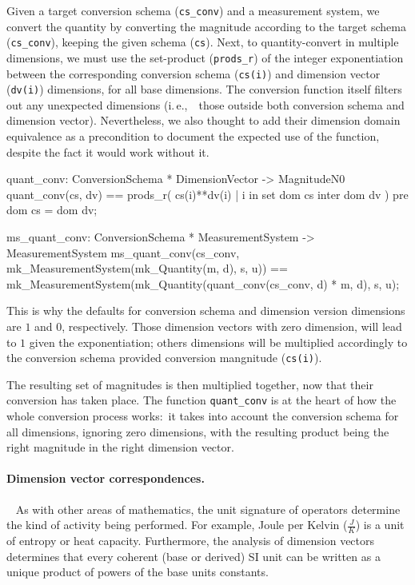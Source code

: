 \documentclass[runningheads,a4paper]{llncs}
\newcommand{\ie}{i.\,e.,\ }
\begin{document}
Given a target conversion schema (\texttt{cs\_conv}) and a measurement system, we convert the quantity by converting the magnitude according to the target schema (\texttt{cs\_conv}), keeping the given schema (\texttt{cs}). Next, to quantity-convert in multiple dimensions, we must use the set-product (\texttt{prods\_r}) of the integer exponentiation between the corresponding conversion schema (\texttt{cs(i)}) and dimension vector (\texttt{dv(i)}) dimensions, for all base dimensions. The conversion function itself filters out any unexpected dimensions (\ie~those outside both conversion schema and dimension vector). Nevertheless, we also thought to add their dimension domain equivalence as a precondition to document the expected use of the function, despite the fact it would work without it.  
%
\begin{vdmsl}[frame=none,basicstyle=\ttfamily\scriptsize]
    quant_conv: ConversionSchema * DimensionVector -> MagnitudeN0
    quant_conv(cs, dv) ==
        prods_r({ cs(i)**dv(i) | i in set dom cs inter dom dv })
    pre
        dom cs = dom dv;

    ms_quant_conv: ConversionSchema * MeasurementSystem -> MeasurementSystem
    ms_quant_conv(cs_conv, mk_MeasurementSystem(mk_Quantity(m, d), s, u)) ==
        mk_MeasurementSystem(mk_Quantity(quant_conv(cs_conv, d) * m, d), s, u);
\end{vdmsl}
%
\noindent This is why the defaults for conversion schema and dimension version dimensions are \(1\) and \(0\), respectively. Those dimension vectors with zero dimension, will lead to \(1\) given the exponentiation; others dimensions will be multiplied accordingly to the conversion schema provided conversion mangnitude (\texttt{cs(i)}).

The resulting set of magnitudes is then multiplied together, now that their conversion has taken place. The function \texttt{quant\_conv} is at the heart of how the whole conversion process works:~it takes into account the conversion schema for all dimensions, ignoring zero dimensions, with the resulting product being the right magnitude in the right dimension vector.   

\paragraph*{Dimension vector correspondences.}~
%
As with other areas of mathematics, the unit signature of operators determine the kind of activity being performed. For example, Joule per Kelvin (\(\frac{J}{K}\)) is a unit of entropy or heat capacity. Furthermore, the analysis of dimension vectors determines that every coherent (base or derived) SI unit can be written as a unique product of powers of the base units constants. 
\end{document}
